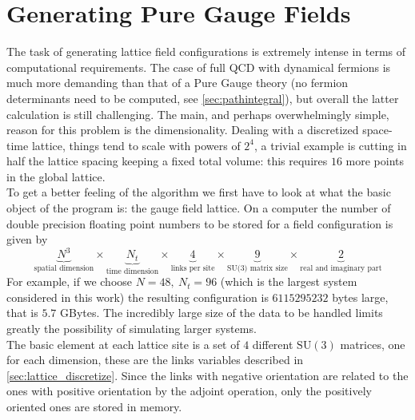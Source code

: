 \section{Generating Pure Gauge Fields} 
The task of generating lattice field configurations is extremely intense in terms of computational requirements. The case of full QCD with dynamical fermions is much more demanding than that of a Pure Gauge theory (no fermion determinants need to be computed, see \cref{sec:pathintegral}), but overall the latter calculation is still challenging. The main, and perhaps overwhelmingly simple, reason for this problem is the dimensionality. Dealing with a discretized space-time lattice, things tend to scale with powers of $2^4$, a trivial example is cutting in half the lattice spacing keeping a fixed total volume: this requires $16$ more points in the global lattice. \\
To get a better feeling of the algorithm we first have to look at what the basic object of the program is: the gauge field lattice. On a computer the number of double precision floating point numbers to be stored for a field configuration is given by
\begin{equation}
    \underbrace{N^3}_\text{spatial dimension} \times
    \underbrace{N_t}_\text{time dimension} \times
    \underbrace{4}_\text{links per site} \times 
    \underbrace{9}_\text{SU(3) matrix size} \times
    \underbrace{2}_\text{real and imaginary part}
\end{equation}
For example, if we choose $N=48,~N_t=96$ (which is the largest system considered in this work) the resulting configuration is $6115295232$ bytes large, that is $5.7$ GBytes.  The incredibly large size of the data to be handled limits greatly the possibility of simulating larger systems. \\
The basic element at each lattice site is a set of $4$ different $\mathrm{SU}(3)$ matrices, one for each dimension, these are the links variables described in \cref{sec:lattice_discretize}. Since the links with negative orientation are related to the ones with positive orientation by the adjoint operation, only the positively oriented ones are stored in memory.  

